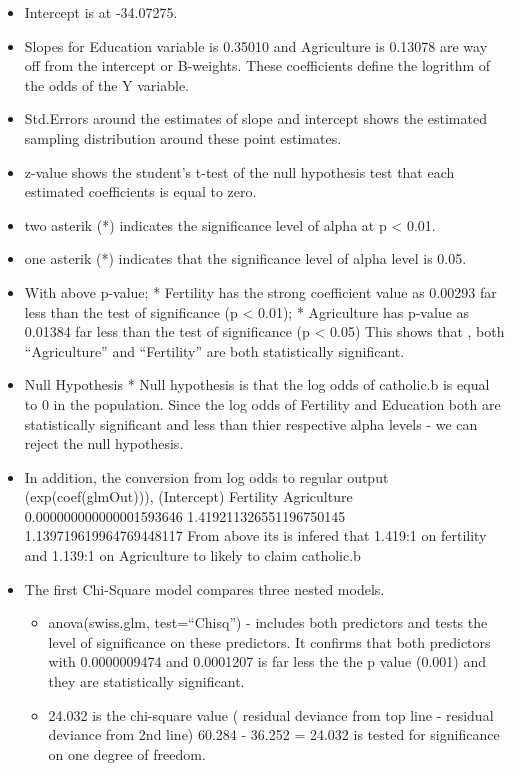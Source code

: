 \documentclass[]{article}
\providecommand{\tightlist}{%
  \setlength{\itemsep}{0pt}\setlength{\parskip}{0pt}}
\begin{document}
\begin{itemize}
\begin{itemize}
    \begin{itemize}
    \item
      Intercept is at -34.07275.
    \item
      Slopes for Education variable is 0.35010 and Agriculture is
      0.13078 are way off from the intercept or B-weights. These
      coefficients define the logrithm of the odds of the Y variable.
    \item
      Std.Errors around the estimates of slope and intercept shows the
      estimated sampling distribution around these point estimates.
    \item
      z-value shows the student's t-test of the null hypothesis test
      that each estimated coefficients is equal to zero.
    \item
      two asterik (*) indicates the significance level of alpha at p
      \textless{} 0.01.
    \item
      one asterik (*) indicates that the significance level of alpha
      level is 0.05.
    \item
      With above p-value; * Fertility has the strong coefficient value
      as 0.00293 far less than the test of significance (p \textless{}
      0.01); * Agriculture has p-value as 0.01384 far less than the test
      of significance (p \textless{} 0.05) This shows that , both
      ``Agriculture'' and ``Fertility'' are both statistically
      significant.
    \item
      Null Hypothesis * Null hypothesis is that the log odds of
      catholic.b is equal to 0 in the population. Since the log odds of
      Fertility and Education both are statistically significant and
      less than thier respective alpha levels - we can reject the null
      hypothesis.
    \item
      In addition, the conversion from log odds to regular output
      (exp(coef(glmOut))), (Intercept) Fertility Agriculture
      0.000000000000001593646 1.419211326551196750145
      1.139719619964769448117 From above its is infered that 1.419:1 on
      fertility and 1.139:1 on Agriculture to likely to claim catholic.b
    \item
      The first Chi-Square model compares three nested models.

      \begin{itemize}
      \tightlist
      \item
        anova(swiss.glm, test=``Chisq'') - includes both predictors and
        tests the level of significance on these predictors. It confirms
        that both predictors with 0.0000009474 and 0.0001207 is far less
        the the p value (0.001) and they are statistically significant.
      \item
        24.032 is the chi-square value ( residual deviance from top line
        - residual deviance from 2nd line) 60.284 - 36.252 = 24.032 is
        tested for significance on one degree of freedom.
      \end{itemize}
    \end{itemize}
  \end{itemize}
\end{itemize}
\end{document}
